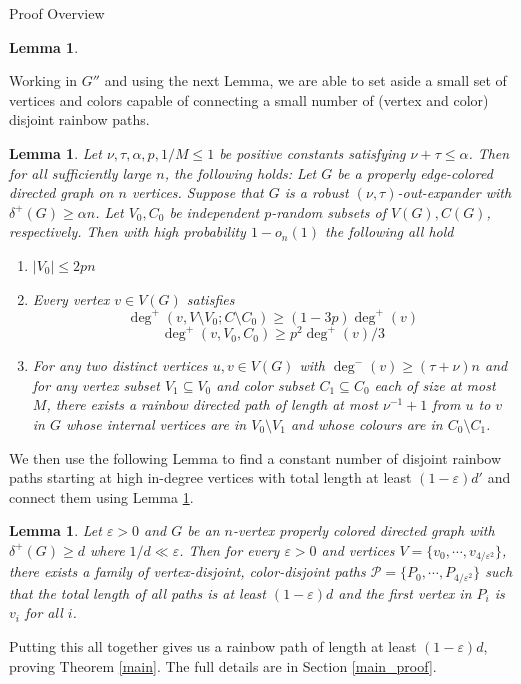 \documentclass[11pt,a4paper]{article}
\newtheorem{lemma}[subsection]{Lemma}
\newcommand{\vep}{\varepsilon}
\begin{document}
\begin{section}{Proof Overview}
\begin{lemma}
\begin{enumerate}
\end{enumerate}
\end{lemma}
Working in $G''$ and using the next Lemma, we are able to set aside a small set of vertices and colors capable of connecting a small number of (vertex and color) disjoint rainbow paths.
\begin{lemma} \label{path_connecter} Let $\nu, \tau, \alpha, p, 1/M \leq 1$ be positive constants satisfying $\nu + \tau \leq \alpha$. Then for all sufficiently large $n$, the following holds: Let $G$ be a properly edge-colored directed graph on $n$ vertices. Suppose that $G$ is a robust $(\nu, \tau)$-out-expander with $\delta^+(G) \geq \alpha n$. Let $V_0, C_0$ be independent $p$-random subsets of $V(G), C(G)$, respectively. Then with high probability $1 - o_n(1)$ the following all hold
\begin{enumerate}
\item[ \textbf{B1}] $|V_0| \leq 2pn$
\item[ \textbf{B2}] Every vertex $v \in V(G)$ satisfies
\[
\deg^+ (v, V \setminus V_0 ; C \setminus C_0 ) \geq (1 - 3p) \deg^+(v)
\]
\[
\deg^{+} (v, V_0, C_0) \geq  p^2 \deg^{+}(v)/3
\]

\item[ \textbf{B3}] For any two distinct vertices $u, v \in V(G)$ with $\deg^{-}(v) \geq  (\tau + \nu) n$ and for any vertex subset $V_1 \subseteq V_0$ and color subset $C_1 \subseteq C_0$ each of size at most $M$, there exists a rainbow directed path of length at most $\nu^{-1} + 1$ from $u$ to $v$ in $G$ whose internal vertices are in $V_0 \setminus V_1$ and whose colours are in $C_0 \setminus C_1$.
\end{enumerate}
\end{lemma}
We then use the following Lemma to find a constant number of disjoint rainbow paths starting at high in-degree vertices with total length at least $(1 - \vep) d'$ and connect them using Lemma \ref{path_connecter}.
\begin{lemma} \label{path_forest} Let $\vep > 0$ and $G$ be an $n$-vertex properly colored directed graph  with $\delta^+(G) \geq d$ where $1/d \ll \vep$. Then for every $\vep > 0$ and vertices $V = \{v_0, \cdots, v_{4/\vep^2} \}$, there exists a family of vertex-disjoint, color-disjoint paths $\mathcal P = \{ P_0, \cdots, P_{4/\vep^2} \}$ such that the total length of all paths is at least $(1 - \vep) d$ and the first vertex in $P_i$ is $v_i$ for all $i$.
\end{lemma}
Putting this all together gives us a rainbow path of length at least $(1 - \vep) d$, proving Theorem \ref{main}. The full details are in Section \ref{main_proof}.
\end{section}
\end{document}
